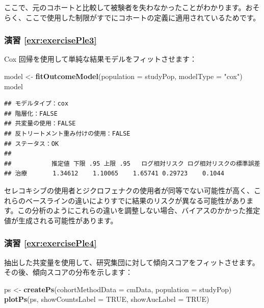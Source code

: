 \documentclass[
  11pt]{book}
\newenvironment{Shaded}{\begin{snugshade}}{\end{snugshade}}
\newcommand{\AttributeTok}[1]{\textcolor[rgb]{0.13,0.29,0.53}{#1}}
\newcommand{\ConstantTok}[1]{\textcolor[rgb]{0.56,0.35,0.01}{#1}}
\newcommand{\FunctionTok}[1]{\textcolor[rgb]{0.13,0.29,0.53}{\textbf{#1}}}
\newcommand{\NormalTok}[1]{#1}
\newcommand{\OtherTok}[1]{\textcolor[rgb]{0.56,0.35,0.01}{#1}}
\newcommand{\StringTok}[1]{\textcolor[rgb]{0.31,0.60,0.02}{#1}}
\theoremstyle{definition}
\theoremstyle{definition}
\theoremstyle{definition}
\theoremstyle{definition}
\theoremstyle{remark}
\begin{document}
ここで、元のコホートと比較して被験者を失わなかったことがわかります。おそらく、ここで使用した制限がすでにコホートの定義に適用されているためです。

\subsubsection*{演習 \ref{exr:exercisePle3}}\label{ux6f14ux7fd2-refexrexerciseple3}

Cox 回帰を使用して単純な結果モデルをフィットさせます：

\begin{Shaded}
\begin{Highlighting}[]
\NormalTok{model }\OtherTok{\textless{}{-}} \FunctionTok{fitOutcomeModel}\NormalTok{(}\AttributeTok{population =}\NormalTok{ studyPop,}
                         \AttributeTok{modelType =} \StringTok{"cox"}\NormalTok{)}
\NormalTok{model}
\end{Highlighting}
\end{Shaded}

\begin{verbatim}
## モデルタイプ：cox
## 階層化：FALSE
## 共変量の使用：FALSE
## 反トリートメント重み付けの使用：FALSE
## ステータス：OK
## 
##           推定値 下限 .95 上限 .95   ログ相対リスク ログ相対リスクの標準誤差
## 治療       1.34612    1.10065    1.65741 0.29723    0.1044
\end{verbatim}

セレコキシブの使用者とジクロフェナクの使用者が同等でない可能性が高く、これらのベースラインの違いによりすでに結果のリスクが異なる可能性があります。この分析のようにこれらの違いを調整しない場合、バイアスのかかった推定値が生成される可能性があります。

\subsubsection*{演習 \ref{exr:exercisePle4}}\label{ux6f14ux7fd2-refexrexerciseple4}

抽出した共変量を使用して、研究集団に対して傾向スコアをフィットさせます。その後、傾向スコアの分布を示します：

\begin{Shaded}
\begin{Highlighting}[]
\NormalTok{ps }\OtherTok{\textless{}{-}} \FunctionTok{createPs}\NormalTok{(}\AttributeTok{cohortMethodData =}\NormalTok{ cmData,}
               \AttributeTok{population =}\NormalTok{ studyPop)}
\FunctionTok{plotPs}\NormalTok{(ps, }\AttributeTok{showCountsLabel =} \ConstantTok{TRUE}\NormalTok{, }\AttributeTok{showAucLabel =} \ConstantTok{TRUE}\NormalTok{)}
\end{Highlighting}
\end{Shaded}
\end{document}
